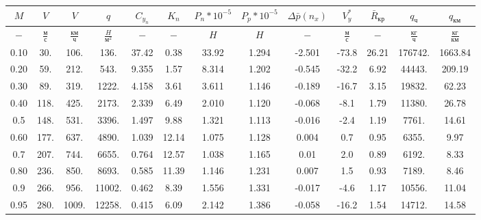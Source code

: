 \begin{tabular}{|c|c|c|c|c|c|c|c|c|c|c|c|c|}
\hline
$M$ & $V$ & $V$ & $q$ & $C_{y_n}$ & $K_n$ & $P_n*10^{-5}$ & $P_p*10^{-5}$ & $\Delta \bar{p}(n_x)$ & $V_y^*$ & $\bar{R}_{кр}$ & $q_{ч}$ & $q_{км}$ \\ 
\hline
$-$ & $\frac{м}{с}$ & $\frac{км}{ч}$ & $\frac{H}{м^2}$ & $-$ & $-$ & $H$ & $H$ & $-$ & $\frac{м}{с}$ & $-$ & $\frac{кг}{ч}$ & $\frac{кг}{км}$ \\ 
\hline
0.10 & 30. & 106. & 136. & 37.42 & 0.38 & 33.92 & 1.294 & -2.501 & -73.8 & 26.21 & 176742. & 1663.84 \\ 
\hline
0.20 & 59. & 212. & 543. & 9.355 & 1.57 & 8.314 & 1.202 & -0.545 & -32.2 & 6.92 & 44443. & 209.19 \\ 
\hline
0.30 & 89. & 319. & 1222. & 4.158 & 3.61 & 3.611 & 1.146 & -0.189 & -16.7 & 3.15 & 19832. & 62.23 \\ 
\hline
0.40 & 118. & 425. & 2173. & 2.339 & 6.49 & 2.010 & 1.120 & -0.068 & -8.1 & 1.79 & 11380. & 26.78 \\ 
\hline
0.5 & 148. & 531. & 3396. & 1.497 & 9.88 & 1.321 & 1.113 & -0.016 & -2.4 & 1.19 & 7761. & 14.61 \\ 
\hline
0.60 & 177. & 637. & 4890. & 1.039 & 12.14 & 1.075 & 1.128 & 0.004 & 0.7 & 0.95 & 6355. & 9.97 \\ 
\hline
0.7 & 207. & 744. & 6655. & 0.764 & 12.57 & 1.038 & 1.165 & 0.01 & 2.0 & 0.89 & 6192. & 8.33 \\ 
\hline
0.80 & 236. & 850. & 8693. & 0.585 & 11.39 & 1.146 & 1.231 & 0.007 & 1.5 & 0.93 & 7189. & 8.46 \\ 
\hline
0.9 & 266. & 956. & 11002. & 0.462 & 8.39 & 1.556 & 1.331 & -0.017 & -4.6 & 1.17 & 10556. & 11.04 \\ 
\hline
0.95 & 280. & 1009. & 12258. & 0.415 & 6.09 & 2.142 & 1.386 & -0.058 & -16.2 & 1.54 & 14712. & 14.58 \\ 
\hline
\end{tabular}